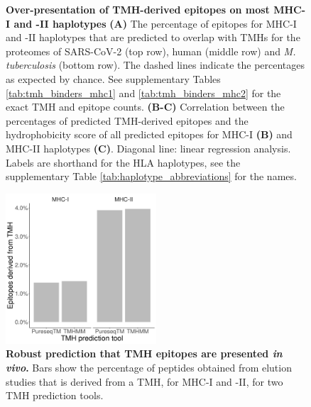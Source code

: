 \begin{figure}[!htbp]
\begin{subfigure}[t]{0.35\textwidth}
    \label{fig:hydrophobicity_2}
  \end{subfigure}  
  \caption{ \textbf{Over-presentation of TMH-derived epitopes on most MHC-I and -II haplotypes}
    \textbf{(A)} 
    The percentage of epitopes for MHC-I and -II haplotypes that are predicted to 
    overlap with TMHs for the proteomes of SARS-CoV-2 (top row), human (middle 
    row) and \emph{M. tuberculosis} (bottom row).
    The dashed lines indicate the percentages as expected by chance.
    See supplementary Tables \ref{tab:tmh_binders_mhc1} and \ref{tab:tmh_binders_mhc2}
    for the exact TMH and  epitope counts.
    \textbf{(B-C)}
    Correlation between the percentages of predicted TMH-derived epitopes
    and the hydrophobicity score of all predicted epitopes for MHC-I \textbf{(B)}
    and MHC-II haplotypes \textbf{(C)}. Diagonal line: linear regression analysis. 
    Labels are shorthand for the HLA haplotypes,
    see the supplementary Table \ref{tab:haplotype_abbreviations} for the names.
  }
\end{figure}


\clearpage

\thispagestyle{empty}

\begin{figure}[!htbp]
  \centering
  \includegraphics[width=0.5\textwidth]{bbbq_article_issue_157/results.png}
  \caption{
    \textbf{
      Robust prediction that TMH epitopes are presented \emph{in vivo}.
    }
    Bars show the percentage of peptides obtained from elution
    studies that is derived from a TMH, for MHC-I and -II,
    for two TMH prediction tools.
  }
  \label{fig:elution}
\end{figure}

\clearpage

\thispagestyle{empty}

